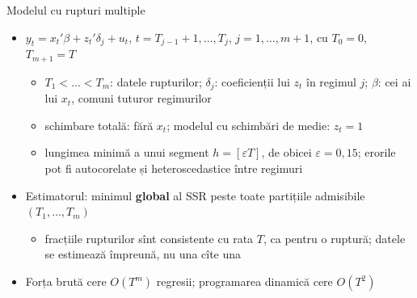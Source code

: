 \begin{frame}{Modelul cu rupturi multiple}
\itemsize{\small}
\begin{itemize}
    \item $y_t = x_t'\beta + z_t'\delta_j + u_t$, $t = T_{j-1} + 1, \dots, T_j$, $j = 1, \dots, m + 1$, cu $T_0 = 0$, $T_{m+1} = T$ 
    \begin{itemize}
        \item $T_1 < \dots < T_m$: datele rupturilor; $\delta_j$: coeficienții lui $z_t$ în regimul $j$; $\beta$: cei ai lui $x_t$, comuni tuturor regimurilor
        \item schimbare totală: fără $x_t$; modelul cu schimbări de medie: $z_t = 1$
        \item lungimea minimă a unui segment $h = [\varepsilon T]$, de obicei $\varepsilon = 0{,}15$; erorile pot fi autocorelate și heteroscedastice între regimuri
    \end{itemize}
    \item Estimatorul: minimul \textbf{global} al SSR peste toate partițiile admisibile $(T_1, \dots, T_m)$
    \begin{itemize}
        \item fracțiile rupturilor sînt consistente cu rata $T$, ca pentru o ruptură; datele se estimează împreună, nu una cîte una
    \end{itemize}
    \item Forța brută cere $O(T^m)$ regresii; programarea dinamică cere $O(T^2)$ 
\end{itemize}
\end{frame}

